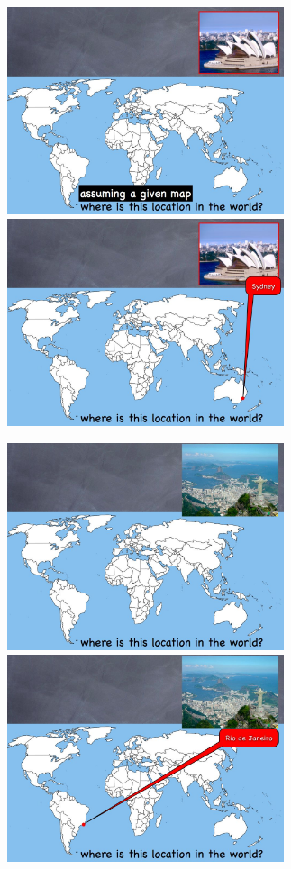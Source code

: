 \begin{figure}
\centerline{
\mbox{\includegraphics[width=3.20in]{figures/8_loc1.jpg}}
\mbox{\includegraphics[width=3.20in]{figures/8_loc2.jpg}}
}
\end{figure}

\begin{figure}
\centerline{
\mbox{\includegraphics[width=3.20in]{figures/8_loc3.jpg}}
\mbox{\includegraphics[width=3.20in]{figures/8_loc4.jpg}}
}
\end{figure}

